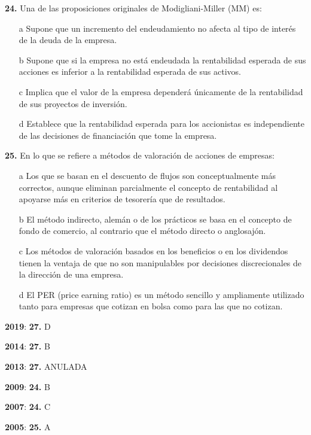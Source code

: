 \documentclass{nuevotema}
\begin{document}
\textbf{24.} Una de las proposiciones originales de Modigliani-Miller (MM) es:

\begin{enumerate}
	\item[a] Supone que un incremento del endeudamiento no afecta al tipo de interés de la deuda de la empresa.
	\item[b] Supone que si la empresa no está endeudada la rentabilidad esperada de sus acciones es inferior a la rentabilidad esperada de sus activos.
	\item[c] Implica que el valor de la empresa dependerá únicamente de la rentabilidad de sus proyectos de inversión.
	\item[d] Establece que la rentabilidad esperada para los accionistas es independiente de las decisiones de financiación que tome la empresa.
\end{enumerate}

\textbf{25.} En lo que se refiere a métodos de valoración de acciones de empresas:

\begin{enumerate}
	\item[a] Los que se basan en el descuento de flujos son conceptualmente más correctos, aunque eliminan parcialmente el concepto de rentabilidad al apoyarse más en criterios de tesorería que de resultados.
	\item[b] El método indirecto, alemán o de los prácticos se basa en el concepto de fondo de comercio, al contrario que el método directo o anglosajón.
	\item[c] Los métodos de valoración basados en los beneficios o en los dividendos tienen la ventaja de que no son manipulables por decisiones discrecionales de la dirección de una empresa.
	\item[d] El PER (price earning ratio) es un método sencillo y ampliamente utilizado tanto para empresas que cotizan en bolsa como para las que no cotizan.
\end{enumerate}

\notas

\textbf{2019}: \textbf{27.} D

\textbf{2014}: \textbf{27.} B

\textbf{2013}: \textbf{27.} ANULADA

\textbf{2009}: \textbf{24.} B

\textbf{2007}: \textbf{24.} C

\textbf{2005}: \textbf{25.} A
\end{document}
